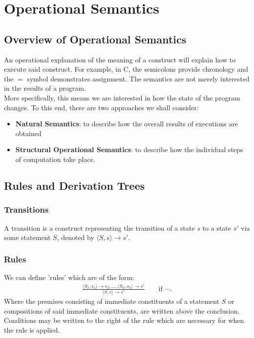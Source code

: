 \documentclass[a4paper, 12pt, twoside]{article}
\begin{document}
\section{Operational Semantics}

\subsection{Overview of Operational Semantics}

An operational explanation of the meaning of a construct will explain
how to execute said construct. For example, in C, the semicolons provide
chronology and the $=$ symbol demonstrates assignment. The semantics
are not merely interested in the results of a program.
\\[\baselineskip]
More specifically, this means we are interested in how the state of the
program changes. To this end, there are two approaches we shall consider:
\begin{itemize}
  \item \textbf{Natural Semantics}: to describe how the overall
  results of executions are obtained
  \item \textbf{Structural Operational Semantics}: to describe how
  the individual steps of computation take place.
\end{itemize}

\subsection{Rules and Derivation Trees}

\subsubsection{Transitions}

A transition is a construct representing the transition of
a state $s$ to a state $s'$ via some statement $S$, denoted
by $\langle S, s \rangle \to s'$.

\subsubsection{Rules}

We can define 'rules' which are of the form: \begin{gather*}
  \frac{
    \langle S_1, s_1 \rangle \to s_2, \ldots, \langle S_n, s_n \rangle \to s'
  }{
    \langle S, s \rangle \to s'
  } \qquad \text{if } \cdots.
\end{gather*} Where the premises consisting of immediate constituents 
of a statement $S$ or compositions of said immediate constituents, 
are written above the conclusion. Conditions may be written to the right
of the rule which are necessary for when the rule is applied.
\end{document}

